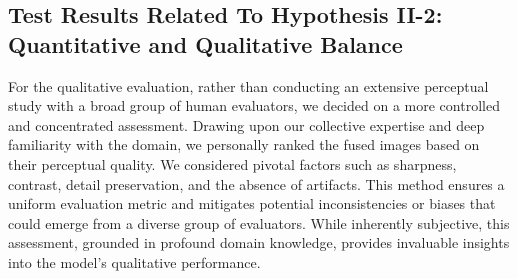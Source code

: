\subsection{Test Results Related To Hypothesis II-2: Quantitative and Qualitative Balance} \label{subsec:met5res}


For the qualitative evaluation, rather than conducting an extensive perceptual study with a broad group of human evaluators, we decided on a more controlled and concentrated assessment. Drawing upon our collective expertise and deep familiarity with the domain, we personally ranked the fused images based on their perceptual quality. We considered pivotal factors such as sharpness, contrast, detail preservation, and the absence of artifacts. This method ensures a uniform evaluation metric and mitigates potential inconsistencies or biases that could emerge from a diverse group of evaluators. While inherently subjective, this assessment, grounded in profound domain knowledge, provides invaluable insights into the model's qualitative performance.

